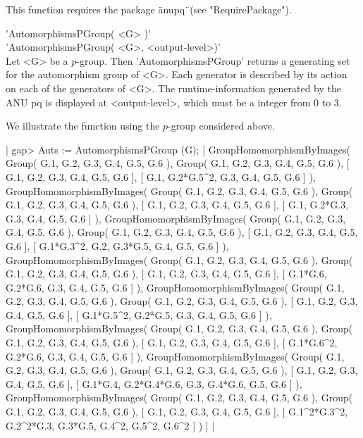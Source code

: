 This function requires the package \"anupq\"\ (see "RequirePackage").


'AutomorphismsPGroup( <G> )' \\
'AutomorphismsPGroup( <G>, <output-level>)' \\

Let  <G>  be  a  $p$-group.   Then  'AutomorphismsPGroup'   returns  a
generating  set  for  the automorphism  group of <G>.  Each  generator
is    described   by its  action  on  each  of  the generators of <G>.
The runtime-information  generated  by  the ANU pq is displayed at
<output-level>, which must be a integer from 0 to 3.

We illustrate the function using the $p$-group considered above.

|    gap> Auts := AutomorphismsPGroup (G);
    [ GroupHomomorphismByImages( Group( G.1, G.2, G.3, G.4, G.5,
        G.6 ), Group( G.1, G.2, G.3, G.4, G.5, G.6 ),
        [ G.1, G.2, G.3, G.4, G.5, G.6 ],
        [ G.1, G.2*G.5^2, G.3, G.4, G.5, G.6 ] ),
      GroupHomomorphismByImages( Group( G.1, G.2, G.3, G.4, G.5,
        G.6 ), Group( G.1, G.2, G.3, G.4, G.5, G.6 ),
        [ G.1, G.2, G.3, G.4, G.5, G.6 ],
        [ G.1, G.2*G.3, G.3, G.4, G.5, G.6 ] ),
      GroupHomomorphismByImages( Group( G.1, G.2, G.3, G.4, G.5,
        G.6 ), Group( G.1, G.2, G.3, G.4, G.5, G.6 ),
        [ G.1, G.2, G.3, G.4, G.5, G.6 ], [ G.1*G.3^2, G.2, G.3*G.5, G.4,
          G.5, G.6 ] ), GroupHomomorphismByImages( Group( G.1, G.2, G.3,
        G.4, G.5, G.6 ), Group( G.1, G.2, G.3, G.4, G.5, G.6 ),
        [ G.1, G.2, G.3, G.4, G.5, G.6 ],
        [ G.1*G.6, G.2*G.6, G.3, G.4, G.5, G.6 ] ),
      GroupHomomorphismByImages( Group( G.1, G.2, G.3, G.4, G.5,
        G.6 ), Group( G.1, G.2, G.3, G.4, G.5, G.6 ),
        [ G.1, G.2, G.3, G.4, G.5, G.6 ], [ G.1*G.5^2, G.2*G.5, G.3, G.4,
          G.5, G.6 ] ), GroupHomomorphismByImages( Group( G.1, G.2, G.3,
        G.4, G.5, G.6 ), Group( G.1, G.2, G.3, G.4, G.5, G.6 ),
        [ G.1, G.2, G.3, G.4, G.5, G.6 ], [ G.1*G.6^2, G.2*G.6, G.3, G.4,
          G.5, G.6 ] ), GroupHomomorphismByImages( Group( G.1, G.2, G.3,
        G.4, G.5, G.6 ), Group( G.1, G.2, G.3, G.4, G.5, G.6 ),
        [ G.1, G.2, G.3, G.4, G.5, G.6 ],
        [ G.1*G.4, G.2*G.4*G.6, G.3, G.4*G.6, G.5, G.6 ] ),
      GroupHomomorphismByImages( Group( G.1, G.2, G.3, G.4, G.5,
        G.6 ), Group( G.1, G.2, G.3, G.4, G.5, G.6 ),
        [ G.1, G.2, G.3, G.4, G.5, G.6 ],
        [ G.1^2*G.3^2, G.2^2*G.3, G.3*G.5, G.4^2, G.5^2, G.6^2 ] ) ] |

